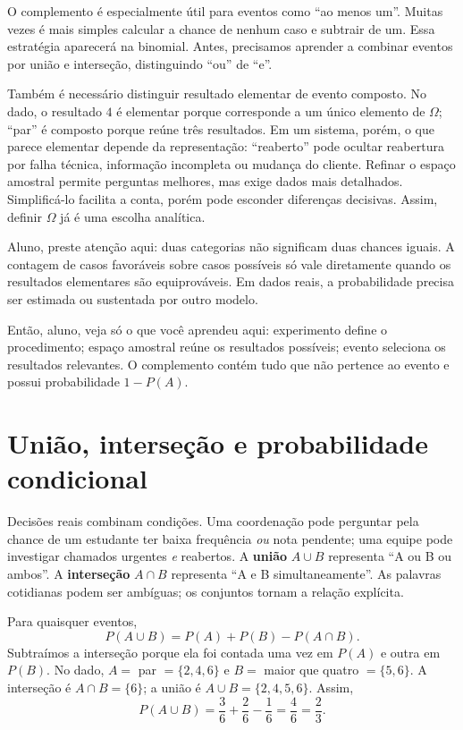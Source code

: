O complemento é especialmente útil para eventos como ``ao menos um''. Muitas vezes é mais simples calcular a chance de nenhum caso e subtrair de um. Essa estratégia aparecerá na binomial. Antes, precisamos aprender a combinar eventos por união e interseção, distinguindo ``ou'' de ``e''.

Também é necessário distinguir resultado elementar de evento composto. No dado, o resultado $4$ é elementar porque corresponde a um único elemento de $\Omega$; ``par'' é composto porque reúne três resultados. Em um sistema, porém, o que parece elementar depende da representação: ``reaberto'' pode ocultar reabertura por falha técnica, informação incompleta ou mudança do cliente. Refinar o espaço amostral permite perguntas melhores, mas exige dados mais detalhados. Simplificá-lo facilita a conta, porém pode esconder diferenças decisivas. Assim, definir $\Omega$ já é uma escolha analítica.

\begin{GuidedBox}
Aluno, preste atenção aqui: duas categorias não significam duas chances iguais. A contagem de casos favoráveis sobre casos possíveis só vale diretamente quando os resultados elementares são equiprováveis. Em dados reais, a probabilidade precisa ser estimada ou sustentada por outro modelo.
\end{GuidedBox}

\begin{SummaryBox}
Então, aluno, veja só o que você aprendeu aqui: experimento define o procedimento; espaço amostral reúne os resultados possíveis; evento seleciona os resultados relevantes. O complemento contém tudo que não pertence ao evento e possui probabilidade $1-P(A)$.
\end{SummaryBox}

\section{União, interseção e probabilidade condicional}

Decisões reais combinam condições. Uma coordenação pode perguntar pela chance de um estudante ter baixa frequência \textit{ou} nota pendente; uma equipe pode investigar chamados urgentes \textit{e} reabertos. A \textbf{união} $A\cup B$ representa ``A ou B ou ambos''. A \textbf{interseção} $A\cap B$ representa ``A e B simultaneamente''. As palavras cotidianas podem ser ambíguas; os conjuntos tornam a relação explícita.

Para quaisquer eventos,
\[
P(A\cup B)=P(A)+P(B)-P(A\cap B).
\]
Subtraímos a interseção porque ela foi contada uma vez em $P(A)$ e outra em $P(B)$. No dado, $A=$ par $=\{2,4,6\}$ e $B=$ maior que quatro $=\{5,6\}$. A interseção é $A\cap B=\{6\}$; a união é $A\cup B=\{2,4,5,6\}$. Assim,
\[
P(A\cup B)=\frac{3}{6}+\frac{2}{6}-\frac{1}{6}=\frac{4}{6}=\frac{2}{3}.
\]

